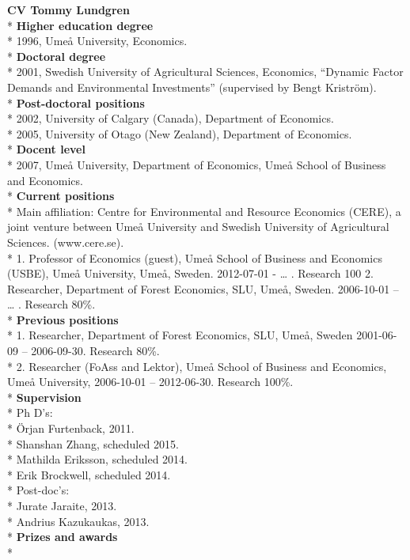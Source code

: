\documentclass[11pt,a4paper]{extarticle}
\begin{document}
\textbf{CV Tommy Lundgren}\\*
\textbf{Higher education degree}\\*
1996, Umeå University, Economics.\\*
\textbf{Doctoral degree}\\*
2001, Swedish University of Agricultural Sciences, Economics, “Dynamic Factor Demands and Environmental Investments” (supervised by Bengt Kriström).\\*
\textbf{Post-doctoral positions}\\*
2002, University of Calgary (Canada), Department of Economics.\\*
2005, University of Otago (New Zealand), Department of Economics.\\*
\textbf{Docent level}\\*
2007, Umeå University, Department of Economics, Umeå School of Business and Economics.\\*
\textbf{Current positions}\\*
Main affiliation: Centre for Environmental and Resource Economics (CERE), a joint venture between Umeå University and Swedish University of Agricultural Sciences. (www.cere.se).\\*
1. Professor of Economics (guest), Umeå School of Business and Economics (USBE), Umeå University, Umeå, Sweden. 2012-07-01 - …  . Research 100%
2. Researcher, Department of Forest Economics, SLU, Umeå, Sweden. 2006-10-01 – … . Research 80\%.\\*
\textbf{Previous positions}\\*
1. Researcher, Department of Forest Economics, SLU, Umeå, Sweden 2001-06-09 – 2006-09-30. Research 80\%.\\*
2. Researcher (FoAss and Lektor), Umeå School of Business and Economics, Umeå University, 2006-10-01 – 2012-06-30. Research 100\%.\\*
\textbf{Supervision}\\*
Ph D’s:\\*
Örjan Furtenback, 2011.\\*
Shanshan Zhang, scheduled 2015.\\*
Mathilda Eriksson, scheduled 2014.\\*
Erik Brockwell, scheduled 2014.\\*
Post-doc’s:\\*
Jurate Jaraite, 2013.\\*
Andrius Kazukaukas, 2013.\\*
\textbf{Prizes and awards}\\*
\end{document}
